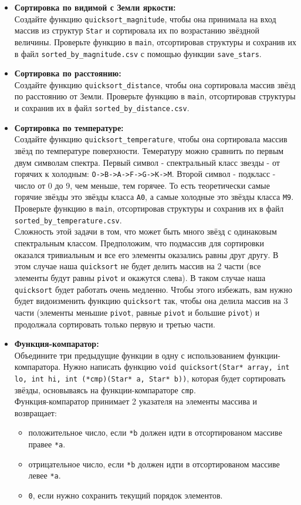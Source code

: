 \documentclass{article}
\begin{document}
\begin{itemize}
\item \textbf{Сортировка по видимой с Земли яркости:}\\ Создайте функцию \texttt{quicksort\_magnitude}, чтобы она принимала на вход массив из структур \texttt{Star} и сортировала их по возрастанию звёздной величины. Проверьте функцию в \texttt{main}, отсортировав структуры и сохранив их в файл \texttt{sorted\_by\_magnitude.csv} с помощью функции \texttt{save\_stars}.

\item \textbf{Сортировка по расстоянию:}\\ Создайте функцию \texttt{quicksort\_distance}, чтобы она сортировала массив звёзд по расстоянию от Земли. Проверьте функцию в \texttt{main}, отсортировав структуры и сохранив их в файл \texttt{sorted\_by\_distance.csv}.

\item \textbf{Сортировка по температуре:}\\ Создайте функцию \texttt{quicksort\_temperature}, чтобы она сортировала массив звёзд по температуре поверхности. Темературу можно сравнить по первым двум символам спектра. Первый символ - спектральный класс звезды - от горячих к холодным: \texttt{O->B->A->F->G->K->M}. Второй символ - подкласс - число от 0 до 9, чем меньше, тем горячее. То есть теоретически самые горячие звёзды это звёзды класса \texttt{A0}, а самые холодные это звёзды класса \texttt{M9}. Проверьте функцию в \texttt{main}, отсортировав структуры и сохранив их в файл \texttt{sorted\_by\_temperature.csv}.\\
Сложность этой задачи в том, что может быть много звёзд с одинаковым спектральным классом. Предположим, что подмассив для сортировки оказался тривиальным и все его элементы оказались равны друг другу. В этом случае наша \texttt{quicksort} не будет делить массив на 2 части (все элементы будут равны \texttt{pivot} и окажутся слева). В таком случае наша \texttt{quicksort} будет работать очень медленно. Чтобы этого избежать, вам нужно будет видоизменить функцию \texttt{quicksort} так, чтобы она делила массив на 3 части (элементы меньшие \texttt{pivot}, равные \texttt{pivot} и большие \texttt{pivot}) и продолжала сортировать только первую и третью части.

\item \textbf{Функция-компаратор:}\\ Объедините три предыдущие функции в одну с использованием функции-компаратора. Нужно написать функцию \texttt{void quicksort(Star* array, int lo, int hi, int (*cmp)(Star* a, Star* b))}, которая будет сортировать звёзды, основываясь на функции-компараторе \texttt{cmp}. \\
Функция-компаратор принимает 2 указателя на элементы массива и возвращает:
\begin{itemize}
\item положительное число, если \texttt{*b} должен идти в отсортированом массиве правее \texttt{*a}.
\item отрицательное число, если \texttt{*b} должен идти в отсортированом массиве левее \texttt{*a}.
\item \texttt{0}, если нужно сохранить текущий порядок элементов.
\end{itemize} 



\end{itemize}
\end{document}
